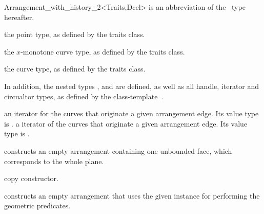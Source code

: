 \begin{ccRefClass}{Arrangement_with_history_2<Traits,Dcel>}
 is an abbreviation of the \ccRefName\ type hereafter.


\ccTypes

\ccGlue
{}

  {the point type, as defined by the traits class.}

  {the $x$-monotone curve type, as defined by the traits class.}

  {the curve type, as defined by the traits class.}

In addition, the nested types ,  and 
are defined, as well as all handle, iterator and circualtor types, as
defined by the 
class-template~.

\ccGlue
{}

    {an iterator for the curves that originate a given arrangement edge.
     Its value type is .}
\ccGlue
{}
    {a  iterator of the curves that originate a given arrangement
     edge. Its value type is .}

\ccCreation
{}
    
    {constructs an empty arrangement containing one unbounded face,
     which corresponds to the
     whole plane.}
    
    {copy constructor.}
        
    {constructs an empty arrangement that uses the given 
     instance for performing the geometric predicates.}




\end{ccRefClass}
